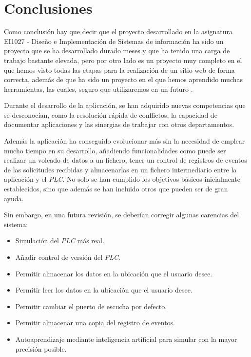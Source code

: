 \documentclass[pdftex,11pt,a4paper]{book}
\begin{document}
\chapter{Conclusiones} 
Como conclusión hay que decir que el proyecto desarrollado en la asignatura EI1027 - Diseño e Implementación de Sistemas de información ha sido un proyecto que se ha desarrollado durado meses y que ha tenido una carga de trabajo bastante elevada, pero por otro lado es un proyecto muy completo en el que hemos visto todas las etapas para la realización de un sitio web de forma correcta, además de que ha sido un proyecto en el que hemos aprendido muchas herramientas, las cuales, seguro que utilizaremos en un futuro .










Durante el desarrollo de la aplicación, se han adquirido nuevas competencias que se desconocían, como la resolución rápida de conflictos, la capacidad de documentar aplicaciones y las sinergias de trabajar con otros departamentos.

Además la aplicación ha conseguido evolucionar más sin la necesidad de emplear mucho tiempo en su desarrollo, añadiendo funcionalidades como puede ser realizar un volcado de datos a un fichero, tener un control de registros de eventos de las solicitudes recibidas y almacenarlas en un fichero intermediario entre la aplicación y el \emph{PLC}. No solo se han cumplido los objetivos básicos inicialmente establecidos, sino que además se han incluido otros que pueden ser de gran ayuda.

Sin embargo, en una futura revisión, se deberían corregir algunas carencias del sistema:
\begin{itemize}
\item Simulación del \emph{PLC} más real.
\item Añadir control de versión del \emph{PLC}.
\item Permitir almacenar los datos en la ubicación que el usuario desee.
\item Permitir leer los datos en la ubicación que el usuario desee.
\item Permitir cambiar el puerto de escucha por defecto.
\item Permitir almacenar una copia del registro de eventos.
\item Autoaprendizaje mediante inteligencia artificial para simular con la mayor precisión posible.
\end{itemize}
\end{document}
